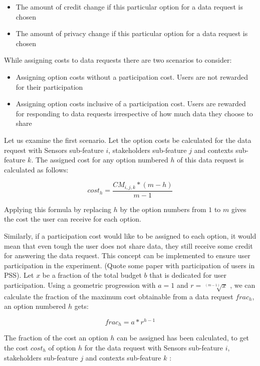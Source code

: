 \begin{itemize}
\item The amount of credit change if this particular option for a data request is chosen
\item The amount of privacy change if this particular option for a data request is chosen
\end{itemize}

While assigning costs to data requests there are two scenarios to consider:

\begin{itemize}
\item Assigning option costs without a participation cost. Users are not rewarded for their participation
\item Assigning option costs inclusive of a participation cost. Users are rewarded for responding to data requests irrespective of how much data they choose to share
\end{itemize}

Let us examine the first scenario. Let the option costs be calculated for the data request with Sensors sub-feature $i$, stakeholders sub-feature $j$ and
contexts sub-feature $k$. The assigned cost for any option numbered $h$ of this data request is calculated as follows:

\begin{equation}
cost_{h} =  \frac{CM_{i,j,k}*(m-h)}{m-1}
\end{equation}

Applying this formula by replacing $h$ by the option numbers from $1$ to $m$ gives the cost the user can receive for each option.


Similarly, if a participation cost would like to be assigned to each option, it would mean that even tough the user does not share data, they still
receive some credit for answering the data request. This concept can be implemented to ensure user participation in the experiment. (Quote some paper with
participation of users in PSS). Let $x$ be a fraction of the total budget $b$ that is dedicated for user participation. Using a geometric progression with $a=1$ and $r=\sqrt[(m-1)]{x}$ , we can calculate the fraction of the maximum cost obtainable from a data request $frac_{h}$, an option numbered $h$ gets:

\begin{equation}
frac_{h} = a * r^{h-1}
\end{equation}

The fraction of the cost an option $h$ can be assigned has been calculated, to get the cost $cost_{h}$ of option $h$ for the data request with Sensors sub-feature $i$, stakeholders sub-feature $j$ and
contexts sub-feature $k$ :

